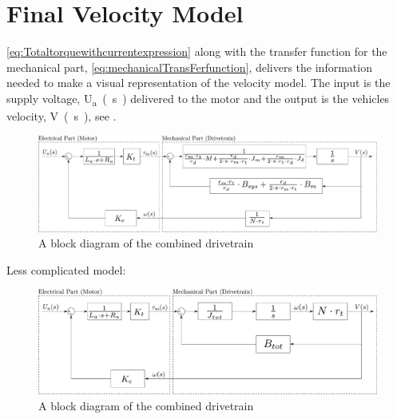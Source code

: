 \section{Final Velocity Model}
\eqref{eq:Totaltorquewithcurrentexpression} along with the transfer function for the mechanical part, \eqref{eq:mechanicalTransFerfunction}, delivers the information needed to make a visual representation of the velocity model. The input is the supply voltage, \si{U_a(s)} delivered to the motor and the output is the vehicles velocity, \si{V(s)}, see . 
%
\begin{figure}[H]
	\centering
	\includegraphics[width=\textwidth]{figures/totalVelocityModelDiagramComplicated.pdf}
	\caption{A block diagram of the combined drivetrain}
	\label{fig:BlockDiagramDrivetrainComplicated}
\end{figure}
%
Less complicated model:

\begin{figure}[H]
	\centering
	\includegraphics[width=\textwidth]{figures/totalVelocityModelDiagramNotComplicated.pdf}
	\caption{A block diagram of the combined drivetrain}
	\label{fig:BlockDiagramDrivetrainNotComplicated}
\end{figure}